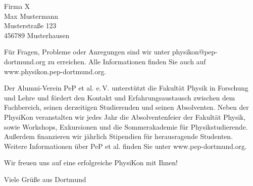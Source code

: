 \documentclass[
  pepbrief,
  fontsize=12pt,
  paper=a4,
  DIV=14,
  parskip=half,
  backaddress=false,
]{scrlttr2}
\begin{document}
\begin{letter}{%
  Firma X\\
  Max Mustermann\\
  Musterstraße 123\\
  456789 Musterhausen

}
Für Fragen, Probleme oder Anregungen sind wir unter physikon@pep-dortmund.org zu erreichen. Alle Informationen finden Sie auch auf www.physikon.pep-dortmund.org.

Der Alumni-Verein PeP et al. e.\,V. unterstützt die Fakultät Physik in Forschung und Lehre und fördert den Kontakt und Erfahrungsaustausch zwischen dem Fachbereich,
seinen derzeitigen Studierenden und seinen Absolventen. Neben der PhysiKon veranstalten wir jedes Jahr die Absolventenfeier der Fakultät Physik, sowie Workshops, Exkursionen
und die Sommerakademie für Physikstudierende. Außerdem finanzieren wir jährlich Stipendien für herausragende Studenten. Weitere Informationen über PeP et al. finden Sie unter
www.pep-dortmund.org.

Wir freuen uns auf eine erfolgreiche PhysiKon mit Ihnen!

\closing{Viele Grüße aus Dortmund}

\end{letter}
\end{document}
